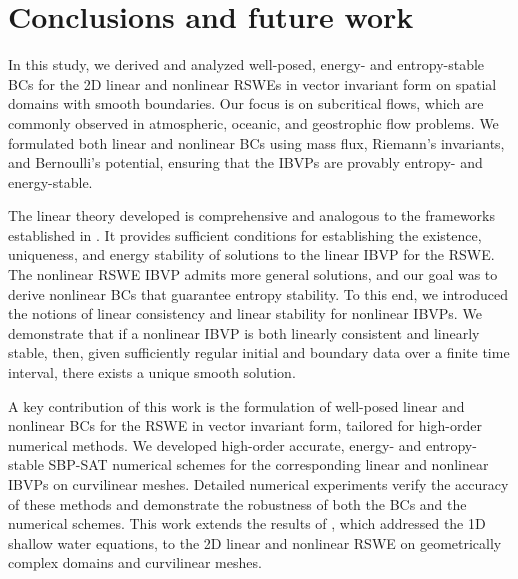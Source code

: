 \documentclass{article}
\numberwithin{equation}{section}
\theoremstyle{definition}
\begin{document}

\section{Conclusions and future work}\label{sec:conclusion}
In this study, we derived and analyzed well-posed, energy- and entropy-stable BCs for the 2D linear and nonlinear RSWEs in vector invariant form on spatial domains with smooth boundaries. Our focus is on subcritical flows, which are commonly observed in atmospheric, oceanic, and geostrophic flow problems. We formulated both linear and nonlinear BCs using mass flux, Riemann's invariants, and Bernoulli’s potential, ensuring that the IBVPs are provably entropy- and energy-stable.

The linear theory developed is comprehensive and analogous to the frameworks established in \cite{GHADER20141, nordstrom2022linear, gustafsson1995time}. It provides sufficient conditions for establishing the existence, uniqueness, and energy stability of solutions to the linear IBVP for the RSWE. The nonlinear RSWE IBVP admits more general solutions, and our goal was to derive nonlinear BCs that guarantee entropy stability. To this end, we introduced the notions of linear consistency and linear stability for nonlinear IBVPs. We demonstrate that if a nonlinear IBVP is both linearly consistent and linearly stable, then, given sufficiently regular initial and boundary data over a finite time interval, there exists a unique smooth solution.

A key contribution of this work is the formulation of well-posed linear and nonlinear BCs for the RSWE in vector invariant form, tailored for high-order numerical methods. We developed high-order accurate, energy- and entropy-stable SBP-SAT numerical schemes for the corresponding linear and nonlinear IBVPs on curvilinear meshes. Detailed numerical experiments verify the accuracy of these methods and demonstrate the robustness of both the BCs and the numerical schemes. This work extends the results of \cite{HEW2025113624}, which addressed the 1D shallow water equations, to the 2D linear and nonlinear RSWE on geometrically complex domains and curvilinear meshes.
\end{document}
